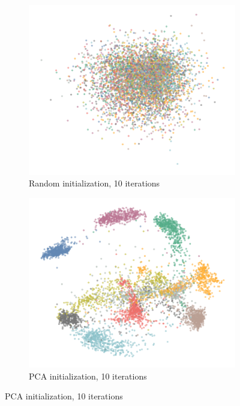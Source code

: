 \begin{figure}[tbp]
  \centering
  \begin{subfigure}{.45\linewidth}
    \centering
    \includegraphics[width=\linewidth]{img/random_10_iters-1}
    \caption{Random initialization, 10 iterations}
  \end{subfigure}
  \begin{subfigure}{.45\linewidth}
    \centering
    \includegraphics[width=\linewidth]{img/pca_10_iters-1}
    \caption{PCA initialization, 10 iterations}
  \end{subfigure}

\end{figure}
